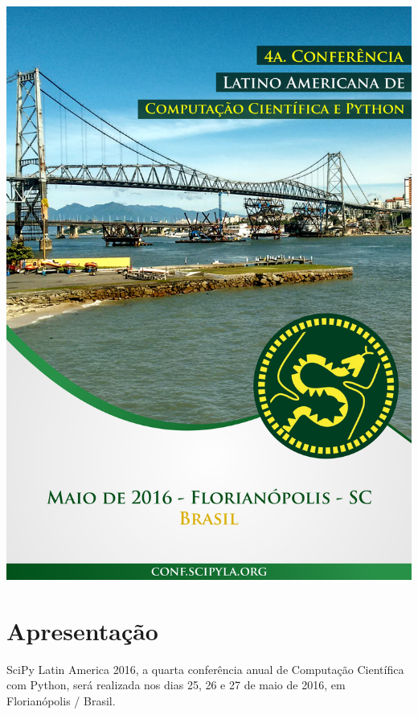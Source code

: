 \documentclass[report,a4paper,twocolumn]{memoir}
\begin{document}
\thispagestyle{empty}
\onecolumn
\begin{center}
  \includegraphics{imagens/capa.jpg}
\end{center}
\twocolumn

\clearpage

\restoregeometry
\pagestyle{plain} %
\setcounter{page}{2}
\tableofcontents

\chapter*{Apresentação}

SciPy Latin America 2016, a quarta conferência anual de Computação Científica com Python, será realizada nos dias 25, 26 e 27 de maio de 2016, em Florianópolis / Brasil.
\end{document}
